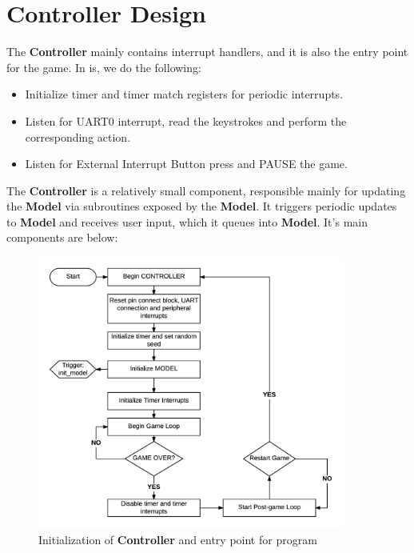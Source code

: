 \section{Controller Design}



  The \textbf{Controller} mainly contains interrupt handlers, and it is also the entry point for the game.
  In is, we do the following:

  \begin{itemize}
    \item Initialize timer and timer match registers for periodic interrupts.
    \item Listen for UART0 interrupt, read the keystrokes and perform the corresponding action.
    \item Listen for External Interrupt Button press and PAUSE the game.
  \end{itemize}

  The \textbf{Controller} is a relatively small component, responsible mainly for updating the \textbf{Model} via subroutines exposed by the \textbf{Model}. It triggers periodic updates to \textbf{Model} and receives user input, which it queues into \textbf{Model}.
  It's main components are below:

  \begin{figure}[H]
    \centering
    \includegraphics[width=0.9\textwidth]{images/controller-base.png}
    \caption{\label{fig:controller-init} Initialization of \textbf{Controller} and entry point for program}
  \end{figure}

